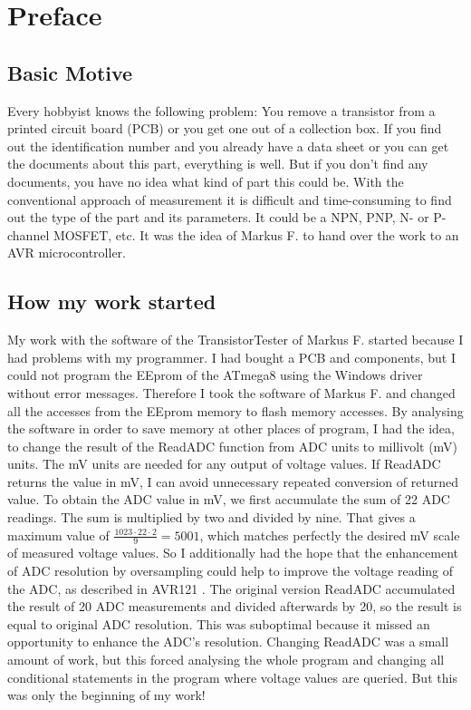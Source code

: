 \section*{Preface}
\subsection*{Basic Motive}
Every hobbyist knows the following problem: You remove a transistor from a printed circuit board (PCB)
or you get one out of a collection box. 
If you find out the identification number and you already have a data sheet or you can get the documents about this part,
 everything is well.
But if you don't find any documents, you have no idea what kind of part this could be.
With the conventional approach of measurement it is difficult and time-consuming to find out the type of the part and its parameters.
It could be a NPN, PNP, N- or P-channel MOSFET, etc.
It was the idea of Markus F. to hand over the work to an AVR microcontroller.
\subsection*{How my work started}
My work with the software of the TransistorTester of Markus F. \cite{Frejek} started because I had problems with 
my programmer. I had bought a PCB and components, but I could not program the EEprom of 
the ATmega8 using the Windows driver without error messages. Therefore I took the software of Markus F. and changed all the accesses
from the EEprom memory to flash memory accesses. By analysing the software in order to save memory
at other places of program, I had the idea, to change the result of the ReadADC function from ADC units
to millivolt (mV) units. The mV units are needed for any output of voltage values.
If ReadADC returns the value in mV, I can avoid unnecessary repeated conversion of returned value.
To obtain the ADC value in mV, we first accumulate the sum of 22 ADC readings.
 The sum is multiplied by two and divided by nine. That gives a maximum value of \begin{math}\frac{1023\cdot22\cdot2}{9} = 5001\end{math},
which matches perfectly the desired mV scale of measured voltage values.
So I additionally had the hope that the enhancement of ADC resolution by oversampling could help to improve the
voltage reading of the ADC, as described in AVR121 \cite{AVR121}.
The original version ReadADC accumulated the result of 20 ADC measurements and divided afterwards by 20, 
so the result is equal to original ADC resolution. This was suboptimal because it missed an opportunity to enhance the ADC's resolution.
Changing ReadADC was a small amount of work, but this forced analysing the whole program and changing
all conditional statements in the program where voltage values are queried.
But this was only the beginning of my work!\\

